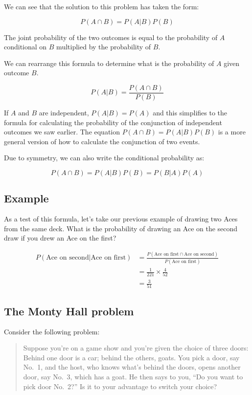 \documentclass[
  letterpaper,
  DIV=11,
  numbers=noendperiod]{scrreprt}
\begin{document}
We can see that the solution to this problem has taken the form:

\[
P(A\cap B)=P(A|B)P(B)
\]

The joint probability of the two outcomes is equal to the probability of
\(A\) conditional on \(B\) multiplied by the probability of \(B\).

We can rearrange this formula to determine what is the probability of
\(A\) given outcome \(B\).

\[
P(A|B)=\frac{P(A\cap B)}{P(B)}
\]

If \(A\) and \(B\) are independent, \(P(A|B)=P(A)\) and this simplifies
to the formula for calculating the probability of the conjunction of
independent outcomes we saw earlier. The equation
\(P(A\cap B)=P(A|B)P(B)\) is a more general version of how to calculate
the conjunction of two events.

Due to symmetry, we can also write the conditional probability as:

\[
P(A\cap B)=P(A|B)P(B)=P(B|A)P(A)
\]

\hypertarget{example}{%
\subsection{Example}\label{example}}

As a test of this formula, let's take our previous example of drawing
two Aces from the same deck. What is the probability of drawing an Ace
on the second draw if you drew an Ace on the first?

\begin{align*}
P(\text{Ace on second}|\text{Ace on first})&=\frac{P(\text{Ace on first}\cap\text{Ace on second})}{P(\text{Ace on first})} \\
&=\frac{1}{221}\times \frac{4}{52} \\
&=\frac{3}{51}
\end{align*}

\hypertarget{the-monty-hall-problem}{%
\subsection{The Monty Hall problem}\label{the-monty-hall-problem}}

Consider the following problem:

\begin{quote}
Suppose you're on a game show and you're given the choice of three
doors: Behind one door is a car; behind the others, goats. You pick a
door, say No.~1, and the host, who knows what's behind the doors, opens
another door, say No.~3, which has a goat. He then says to you, ``Do you
want to pick door No.~2?'' Is it to your advantage to switch your
choice?
\end{quote}
\end{document}
